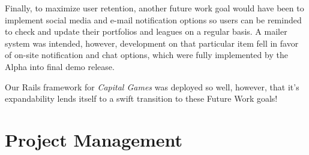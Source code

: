 Finally, to maximize user retention, another future work goal would have been to implement
 social media and e-mail notification options so users can be reminded to check and update their portfolios and leagues on a regular basis. A mailer system was intended, however, 
 development on that particular item fell in favor of on-site notification and chat options, 
 which were fully implemented by the Alpha into final demo release.  

Our Rails framework for \textit{Capital Games} was deployed so well, however, that it's 
expandability lends itself to a swift transition to these Future Work goals! 

\newpage

\section{Project Management}
